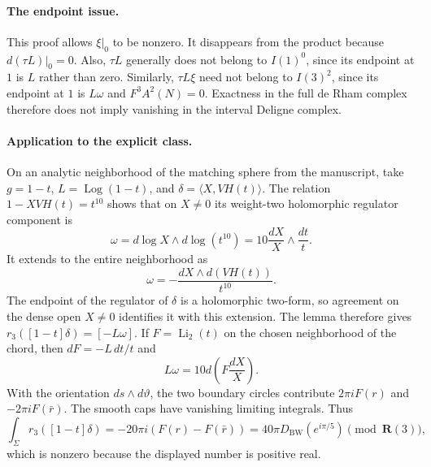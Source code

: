 \paragraph{The endpoint issue.}
This proof allows $\xi|_0$ to be nonzero. It disappears from the
product because $d(\tau L)|_0=0$. Also, $\tau L$ generally does
not belong to $I(1)^0$, since its endpoint at $1$ is $L$ rather
than zero. Similarly, $\tau L\xi$ need not belong to $I(3)^2$,
since its endpoint at $1$ is $L\omega$ and $F^3A^2(N)=0$.
Exactness in the full de Rham complex therefore does not imply
vanishing in the interval Deligne complex.

\paragraph{Application to the explicit class.}
On an analytic neighborhood of the matching sphere from the manuscript,
take $g=1-t$, $L=\operatorname{Log}(1-t)$, and
$\delta=\langle X,VH(t)\rangle$.
The relation $1-XVH(t)=t^{10}$ shows that on $X\ne0$ its
weight-two holomorphic regulator component is
\[
 \omega=d\log X\wedge d\log(t^{10})
       =10\frac{dX}{X}\wedge\frac{dt}{t}.
\]
It extends to the entire neighborhood as
\[
 \omega=-\frac{dX\wedge d(VH(t))}{t^{10}}.
\]
The endpoint of the regulator of $\delta$ is a holomorphic two-form,
so agreement on the dense open $X\ne0$ identifies it with this
extension. The lemma therefore gives
$r_3([1-t]\delta)=[-L\omega]$.
If $F=\operatorname{Li}_2(t)$ on the chosen neighborhood of the
chord, then $dF=-L\,dt/t$ and
\[
 L\omega=10d\left(F\frac{dX}{X}\right).
\]
With the orientation $ds\wedge d\vartheta$, the two boundary
circles contribute $2\pi iF(r)$ and $-2\pi iF(\bar r)$.
The smooth caps have vanishing limiting integrals. Thus
\[
 \int_\Sigma r_3([1-t]\delta)
 =-20\pi i(F(r)-F(\bar r))
 =40\pi D_{\mathrm{BW}}(e^{i\pi/5})
 \pmod{\mathbf R(3)},
\]
which is nonzero because the displayed number is positive real.
